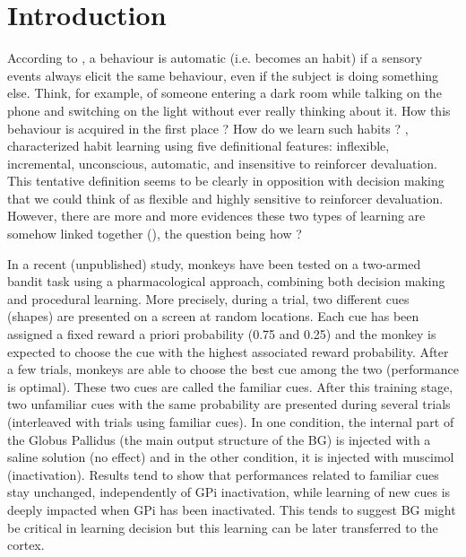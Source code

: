 \section{Introduction}

According to \citet{Schneider1977}, a behaviour is automatic
(i.e. becomes an habit) if a sensory events always elicit the same behaviour,
even if the subject is doing something else. Think, for example, of someone
entering a dark room while talking on the phone and switching on the light
without ever really thinking about it. How this behaviour is acquired in the
first place ? How do we learn such habits ? \citet{Seger2011},
characterized habit learning using five definitional features: inflexible,
incremental, unconscious, automatic, and insensitive to reinforcer
devaluation. This tentative definition seems to be clearly in opposition with
decision making that we could think of as flexible and highly sensitive to
reinforcer devaluation. However, there are more and more evidences these two
types of learning are somehow linked together (\citet{Yin2006}), the
question being how ?

In a recent (unpublished) study, monkeys have been tested on a two-armed bandit
task using a pharmacological approach, combining both decision making and
procedural learning. More precisely, during a trial, two different cues
(shapes) are presented on a screen at random locations. Each cue has been
assigned a fixed reward a priori probability (0.75 and 0.25) and the monkey is
expected to choose the cue with the highest associated reward probability.
After a few trials, monkeys are able to choose the best cue among the two
(performance is optimal). These two cues are called the familiar cues. After
this training stage, two unfamiliar cues with the same probability are
presented during several trials (interleaved with trials using familiar
cues). In one condition, the internal part of the Globus Pallidus (the main
output structure of the BG) is injected with a saline solution (no effect) and
in the other condition, it is injected with muscimol (inactivation). Results
tend to show that performances related to familiar cues stay unchanged,
independently of GPi inactivation, while learning of new cues is deeply
impacted when GPi has been inactivated. This tends to suggest BG might be
critical in learning decision but this learning can be later transferred to the
cortex.





